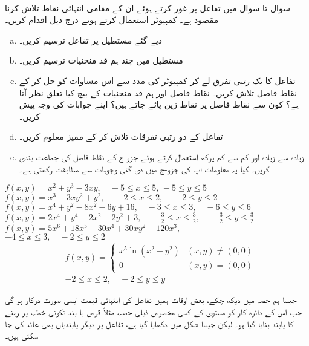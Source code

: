 \\
سوال  تا سوال  میں تفاعل پر غور کرتے ہوئے  ان کے مقامی انتہائی نقاط تلاش کرنا مقصود ہے۔ کمپیوٹر استعمال کرتے ہوئے درج ذیل اقدام کریں۔
\begin{enumerate}[a.]
\item
دیے گئے  مستطیل پر تفاعل ترسیم کریں۔
\item
مستطیل میں چند ہم قد منحنیات ترسیم کریں۔
\item
تفاعل کا یک رتبی تفرق لے کر  کمپیوٹر کی مدد سے اس مساوات کو حل کر کے  نقاط فاصل تلاش کریں۔ نقاط فاصل اور ہم قد منحنیات کے بیچ  کیا تعلق نظر آتا ہے؟ کون سے نقاط فاصل پر نقاط زین پائے جاتے ہیں؟ اپنے جوابات کی وجہ پیش کریں۔ 
\item
تفاعل کے دو رتبی تفرقات تلاش کر کے ممیز  معلوم کریں۔
\item
زیادہ سے زیادہ اور کم سے کم پرکھ استعمال کرتے ہوئے جزو-ج کے نقاط فاصل کی جماعت بندی کریں۔ کیا  یہ   معلومات آپ کی جزو-ج میں دی گئی وجوہات سے مطابقت رکھتی ہے۔
\end{enumerate}

$f(x,y)=x^2+y^3-3xy,\quad -5\le x\le 5,\, -5\le y\le 5$
$f(x,y)=x^3-3xy^2+y^2,\quad -2\le x\le 2,\quad -2\le y\le 2$
$f(x,y)=x^4+y^2-8x^2-6y+16,\quad -3\le x\le 3,\quad -6\le y\le 6$
$f(x,y)=2x^4+y^4-2x^2-2y^2+3,\quad -\frac{3}{2}\le x\le \frac{3}{2},\quad -\frac{3}{2}\le y\le \frac{3}{2}$
$f(x,y)=5x^6+18x^5-30x^4+30xy^2-120x^3,$\\
$ -4\le x\le 3,\quad -2\le y\le 2$
\begin{align*}
&f(x,y)=\begin{cases}x^5\ln(x^2+y^2) &(x,y)\ne (0,0)\\ 0&(x,y)=(0,0)\end{cases}\\
&-2\le x\le 2,\quad -2\le y\le y
\end{align*}

جیسا ہم  حصہ  میں دیکھ چکے،  بعض اوقات ہمیں تفاعل کی انتہائی قیمت ایسی صورت  درکار ہو گی جب اس کے دائرہ کار کو مستوی کے کسی مخصوص  ذیلی  حصہ، مثلاً قرص یا  بند تکونی خطہ،  پر رہنے کا پابند بنایا    گیا ہو۔  لیکن جیسا شکل    میں دکھایا گیا ہے،   تفاعل پر  دیگر  پابندیاں بھی عائد کی جا سکتی ہیں۔

